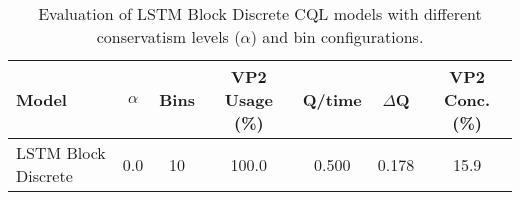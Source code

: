 \begin{table}[ht]
\centering
\caption{Evaluation of LSTM Block Discrete CQL models with different conservatism levels ($\alpha$) and bin configurations.}
\label{tab:lstm_cql_evaluation}
\begin{tabular}{lcccccc}
\toprule
Model & $\alpha$ & Bins & VP2 Usage (\%) & Q/time & $\Delta$Q & VP2 Conc. (\%) \\
\midrule
LSTM Block Discrete & 0.0 & 10 & 100.0 & 0.500 & 0.178 & 15.9 \\
\bottomrule
\end{tabular}
\end{table}